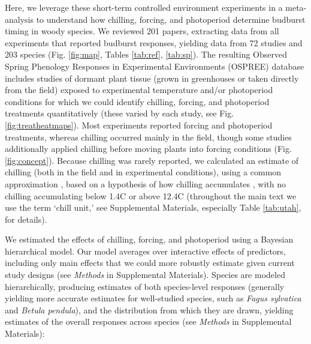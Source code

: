 \documentclass{article}
\newcommand{\R}[1]{\label{#1}\linelabel{#1}}
\begin{document}
\par Here, we leverage these \R{ee3start}short-term controlled environment experiments\R{ee3end} in a meta-analysis to understand how chilling, forcing, and photoperiod determine budburst timing in woody species. We reviewed 201 papers, extracting data from all experiments that reported budburst responses, yielding data from 72 studies and 203 species (Fig. \ref{fig:map}, Tables \ref{tab:ref}, \ref{tab:sp}). The resulting Observed Spring Phenology Responses in Experimental Environments (OSPREE) database includes studies of dormant plant tissue (grown in greenhouses or taken directly from the field) exposed to experimental \R{ee4} temperature and/or photoperiod conditions \emph{\citep{wolkovich2019}} for which we could identify chilling, forcing, and photoperiod treatments quantitatively (these varied by each study, see Fig. \ref{fig:treatheatmaps}\R{heatmap}). Most experiments reported forcing and photoperiod treatments, whereas chilling occurred mainly in the field, though some studies additionally applied chilling before moving plants into forcing conditions (Fig. \ref{fig:concept}). Because chilling was rarely reported, we calculated an estimate of chilling (both in the field and in experimental conditions), using a common approximation \emph{\citep{richardson1974}}, based on a hypothesis of how chilling accumulates \emph{\citep{dennis2003}}, with no chilling accumulating below 1.4\degree C or above 12.4\degree C (throughout the main text we use the term `chill unit,' see Supplemental Materials, especially Table \ref{tab:utah}, for details). 

\par We estimated the effects of chilling, forcing, and photoperiod using a Bayesian hierarchical model. Our model averages over interactive effects of predictors, including only main effects that we could more robustly estimate given current study designs (see \emph{Methods} in Supplemental Materials). Species are modeled hierarchically, producing estimates of both species-level responses (generally yielding more accurate estimates for well-studied species, such as \emph{Fagus sylvatica} and \emph{Betula pendula}), and the distribution from which they are drawn, yielding estimates of the overall responses across species (see \emph{Methods} in Supplemental Materials): 
\end{document}
